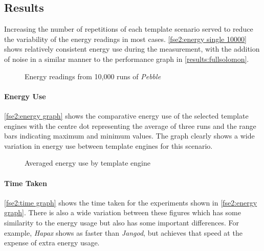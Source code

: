 \subsection{Results}
\label{fse2 results}

Increasing the number of repetitions of each template scenario served to reduce the variability of the energy readings in most cases. \autoref{fse2:energy single 10000} shows relatively consistent energy use during the measurement, with the addition of noise in a similar manner to the performance graph in \autoref{results:fullsolomon}.

\begin{figure}[htbp]
  \centering
  
  \caption{Energy readings from 10,000 runs of \emph{Pebble}}
  \label{fse2:energy single 10000}
\end{figure}

\paragraph{Energy Use}
\label{fse2 results energy}

\autoref{fse2:energy graph} shows the comparative energy use of the selected \gls{template engine}s with the centre dot representing the average of three runs and the range bars indicating maximum and minimum values. The graph clearly shows a wide variation in energy use between \gls{template engine}s for this scenario.

\begin{figure}[htbp]
  \centering
  
  \caption{Averaged energy use by template engine}
  \label{fse2:energy graph}
\end{figure}

\paragraph{Time Taken}
\label{fse2 results time}

\autoref{fse2:time graph} shows the time taken for the experiments shown in \autoref{fse2:energy graph}. There is also a wide variation between these figures which has some similarity to the energy usage but also has some important differences. For example, \emph{Hapax} shows as faster than \emph{Jangod}, but achieves that speed at the expense of extra energy usage.

